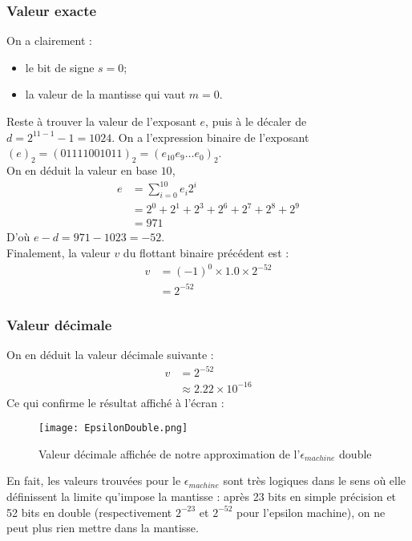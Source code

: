 \documentclass[a4paper, titlepage]{livret} %
\begin{document}
				\subsubsection{Valeur exacte}
					On a clairement : 
					\begin{itemize}
						\item le bit de signe $s = 0$;
						\item la valeur de la mantisse qui vaut $m = 0$.
					\end{itemize}
					Reste à trouver la valeur de l'exposant $e$, puis à le décaler de $d = 2^{11-1}-1 = 1024$.
					On a l'expression binaire de l'exposant $(e)_{2} = (01111001011)_{2} = (e_{10}e_{9}…e_{0})_{2}$.\\
					On en déduit la valeur en base $10$, 
					\[\begin{aligned}
						e & = \sum_{i=0}^{10} e_{i}2^{i}\\
						  & = 2^{0} + 2^{1} + 2^{3} + 2^{6} + 2^{7} + 2^{8} + 2^{9}\\
						  & = 971
					\end{aligned}\]
					D'où $e-d = 971 - 1023 = -52$.\\
					Finalement, la valeur $v$ du flottant binaire précédent est :
					\[\begin{aligned}
						v & = (-1)^{0} \times 1.0 \times 2^{-52}\\
						  & = 2^{-52}
					\end{aligned}\]

				\subsubsection{Valeur décimale}
					On en déduit la valeur décimale suivante :
					\[\begin{aligned}
						v & = 2^{-52}\\
						  & \approx 2.22 \times 10^{-16}
					\end{aligned}\]
					Ce qui confirme le résultat affiché à l'écran :
					\begin{figure}[!h]
						\centering
  							\texttt{[image: EpsilonDouble.png]}
  							\caption{Valeur décimale affichée de notre approximation de l'$\epsilon_{machine}$ double}
					\end{figure}

					En fait, les valeurs trouvées pour le $\epsilon_{machine}$ sont très logiques dans le sens où elle définissent la limite qu'impose la mantisse : après 23 bits en simple précision et 52 bits en double (respectivement $2^{-23}$ et $2^{-52}$ pour l'epsilon machine), on ne peut plus rien mettre dans la mantisse. 
\end{document}
